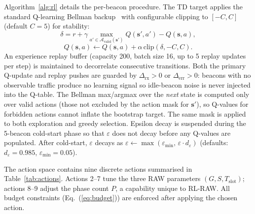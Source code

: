 \documentclass[conference]{IEEEtran}
\begin{document}
Algorithm~\ref{alg:rl} details the per-beacon procedure.
The TD target applies the standard Q-learning Bellman backup~\cite{watkins1992}
with configurable clipping to $[-C, C]$ (default $C = 5$) for stability:
\begin{equation}
  \delta = r + \gamma \max_{a' \in \mathcal{A}_\text{valid}(\mathbf{s}')} Q(\mathbf{s}', a') - Q(\mathbf{s}, a),
  \label{eq:td}
\end{equation}
\begin{equation}
  Q(\mathbf{s}, a) \leftarrow Q(\mathbf{s}, a) + \alpha\,\text{clip}(\delta, -C, C).
  \label{eq:qupdate}
\end{equation}
An experience replay buffer (capacity 200, batch size 16, up to 5 replay
updates per step) is maintained to decorrelate consecutive transitions.
Both the primary Q-update and replay pushes are guarded by
$\Delta_\text{rx}>0$ or $\Delta_\text{err}>0$: beacons with no observable
traffic produce no learning signal so idle-beacon noise is never
injected into the Q-table.
The Bellman max/argmax over the \emph{next} state is computed only over
valid actions (those not excluded by the action mask for $\mathbf{s}'$),
so Q-values for forbidden actions cannot inflate the bootstrap target.
The same mask is applied to both exploration and greedy selection.
Epsilon decay is suspended during the 5-beacon cold-start phase so that
$\varepsilon$ does not decay before any Q-values are populated.
After cold-start, $\varepsilon$ decays as
$\varepsilon \leftarrow \max(\varepsilon_\text{min},\, \varepsilon \cdot d_\varepsilon)$
(defaults: $d_\varepsilon = 0.985$, $\varepsilon_\text{min} = 0.05$).

The action space contains nine discrete actions summarised in
Table~\ref{tab:actions}.
Actions 2--7 tune the three RAW parameters $(G,S,T_\text{slot})$;
actions 8--9 adjust the phase count $P$, a capability unique to RL-RAW.
All budget constraints (Eq.~(\ref{eq:budget})) are enforced after applying
the chosen action.
\end{document}
